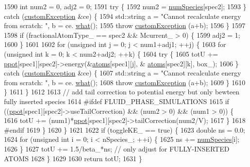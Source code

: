 \begin{DoxyCode}
1590             \textcolor{keywordtype}{int} num2 = 0, adj2 = 0;
1591             \textcolor{keywordflow}{try} \{
1592                 num2 = \hyperlink{classsim_system_a9eea865e6dc1cff377b1e79c4d9c23f0}{numSpecies}[spec2];
1593             \} \textcolor{keywordflow}{catch} (\hyperlink{classcustom_exception}{customException} &ce) \{
1594                 std::string a = \textcolor{stringliteral}{"Cannot recalculate energy from scratch: "}, b = ce.
      \hyperlink{classcustom_exception_aeb6ab5848b038adfc68fde86a512f691}{what}();
1595                 \textcolor{keywordflow}{throw} \hyperlink{classcustom_exception}{customException} (a+b);
1596             \}
1597 
1598             \textcolor{keywordflow}{if} (fractionalAtomType\_ == spec2 && Mcurrent\_ > 0) \{
1599                 adj2 = 1;
1600             \}
1601 
1602             \textcolor{keywordflow}{for} (\textcolor{keywordtype}{unsigned} \textcolor{keywordtype}{int} j = 0; j < num1+adj1; ++j) \{
1603                 \textcolor{keywordflow}{for} (\textcolor{keywordtype}{unsigned} \textcolor{keywordtype}{int} k = 0; k < num2+adj2; ++k) \{
1604                     \textcolor{keywordflow}{try} \{
1605                         totU += \hyperlink{classsim_system_ad2e290b5963f132e6a3a56cee35c8e9f}{ppot}[spec1][spec2]->energy(&\hyperlink{classsim_system_a90421b19082f7fb8fc23b7264b1161e4}{atoms}[spec1][j], &
      \hyperlink{classsim_system_a90421b19082f7fb8fc23b7264b1161e4}{atoms}[spec2][k], box\_);
1606                     \} \textcolor{keywordflow}{catch} (\hyperlink{classcustom_exception}{customException} &ce) \{
1607                         std::string a = \textcolor{stringliteral}{"Cannot recalculate energy from scratch: "}, b = ce.
      \hyperlink{classcustom_exception_aeb6ab5848b038adfc68fde86a512f691}{what}();
1608                         \textcolor{keywordflow}{throw} \hyperlink{classcustom_exception}{customException} (a+b);
1609                     \}
1610                 \}
1611             \}
1612 
1613             \textcolor{comment}{// add tail correction to potential energy but only bewteen fully inserted species}
1614 \textcolor{preprocessor}{#ifdef FLUID\_PHASE\_SIMULATIONS}
1615 \textcolor{preprocessor}{}            \textcolor{keywordflow}{if} ((\hyperlink{classsim_system_ad2e290b5963f132e6a3a56cee35c8e9f}{ppot}[spec1][spec2]->useTailCorrection) && (num2 > 0) && (num1 > 0)) \{
1616                 totU += (num1)*\hyperlink{classsim_system_ad2e290b5963f132e6a3a56cee35c8e9f}{ppot}[spec1][spec2]->tailCorrection(num2/V);
1617             \}
1618 \textcolor{preprocessor}{#endif}
1619 \textcolor{preprocessor}{}        \}
1620     \}
1621 
1622     \textcolor{keywordflow}{if} (toggleKE\_ == \textcolor{keyword}{true}) \{
1623         \textcolor{keywordtype}{double} ns = 0.0;
1624         \textcolor{keywordflow}{for} (\textcolor{keywordtype}{unsigned} \textcolor{keywordtype}{int} i = 0; i < nSpecies\_; ++i) \{
1625             ns += \hyperlink{classsim_system_a9eea865e6dc1cff377b1e79c4d9c23f0}{numSpecies}[i];
1626         \}
1627         totU += 1.5/beta\_*ns; \textcolor{comment}{// only adjust for FULLY-INSERTED ATOMS}
1628     \}
1629 
1630     \textcolor{keywordflow}{return} totU;
1631 \}
\end{DoxyCode}
